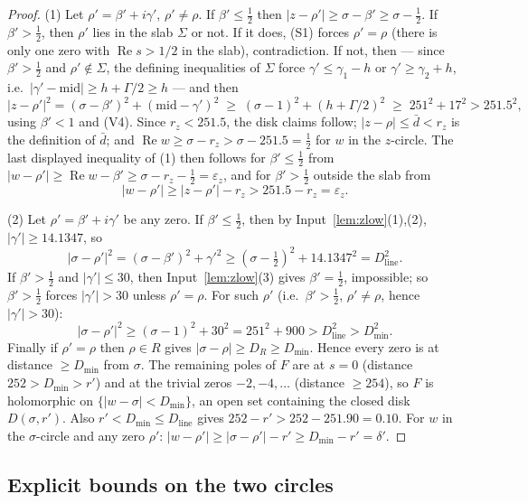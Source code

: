 \documentclass[11pt]{amsart}
\numberwithin{equation}{section}
\newcommand{\re}{\operatorname{Re}}
\newcommand{\Sig}{\sigma}
\newcommand{\dbar}{\bar{d}}
\begin{document}
\begin{proof}
(1) Let $\rho' = \beta' + i\gamma'$, $\rho' \ne \rho$. If
$\beta' \le \tfrac12$ then $|z - \rho'| \ge \Sig - \beta' \ge
\Sig - \tfrac12$. If $\beta' > \tfrac12$, then $\rho'$ lies in the slab
$\Sigma$ or not. If it does, (S1) forces $\rho' = \rho$ (there is only
one zero with $\re s > 1/2$ in the slab), contradiction. If not, then
--- since $\beta' > \tfrac12$ and $\rho' \notin \Sigma$, the defining
inequalities of $\Sigma$ force $\gamma' \le \gamma_1 - h$ or
$\gamma' \ge \gamma_2 + h$, i.e.\
$|\gamma' - \mathrm{mid}| \ge h + \Gamma/2 \ge h$ --- and then
\[
|z - \rho'|^2 = (\Sig - \beta')^2 + (\mathrm{mid} - \gamma')^2
\;\ge\; (\Sig - 1)^2 + (h + \Gamma/2)^2
\;\ge\; 251^2 + 17^2 > 251.5^2,
\]
using $\beta' < 1$ and (V4). Since $r_z < 251.5$, the disk claims
follow; $|z-\rho| \le \dbar < r_z$ is the definition of $\dbar$; and
$\re w \ge \Sig - r_z > \Sig - 251.5 = \tfrac12$ for $w$ in the
$z$-circle. The last displayed inequality of (1) then follows for
$\beta' \le \tfrac12$ from
$|w - \rho'| \ge \re w - \beta' \ge \Sig - r_z - \tfrac12 =
\varepsilon_z$, and for $\beta' > \tfrac12$ outside the slab from
\[
|w-\rho'| \ge |z - \rho'| - r_z > 251.5 - r_z = \varepsilon_z.
\]

(2) Let $\rho' = \beta' + i\gamma'$ be any zero. If $\beta' \le
\tfrac12$, then by Input~\ref{lem:zlow}(1),(2), $|\gamma'| \ge
14.1347$, so
\[
|\Sig - \rho'|^2 = (\Sig - \beta')^2 + \gamma'^2 \ge
(\Sig - \tfrac12)^2 + 14.1347^2 = D_{\mathrm{line}}^2.
\]
If $\beta' > \tfrac12$ and $|\gamma'| \le 30$, then
Input~\ref{lem:zlow}(3) gives $\beta' = \tfrac12$, impossible; so
$\beta' > \tfrac12$ forces $|\gamma'| > 30$ unless $\rho' = \rho$.
For such $\rho'$ (i.e.\ $\beta' > \tfrac12$, $\rho' \neq \rho$, hence
$|\gamma'| > 30$):
\[
|\Sig - \rho'|^2 \ge (\Sig - 1)^2 + 30^2 = 251^2 + 900
> D_{\mathrm{line}}^2 > D_{\min}^2.
\]
Finally if $\rho' = \rho$ then $\rho \in R$ gives
$|\Sig - \rho| \ge D_R \ge D_{\min}$. Hence every zero is at distance
$\ge D_{\min}$ from $\Sig$. The remaining poles of $F$ are at $s = 0$
(distance $252 > D_{\min} > r'$) and at the trivial zeros $-2, -4,
\ldots$ (distance $\ge 254$), so $F$ is holomorphic on
$\{|w - \Sig| < D_{\min}\}$, an open set containing the closed disk
$D(\Sig, r')$. Also $r' < D_{\min} \le D_{\mathrm{line}}$ gives
$252 - r' > 252 - 251.90 = 0.10$. For $w$ in the $\Sig$-circle and any
zero $\rho'$: $|w - \rho'| \ge |\Sig - \rho'| - r' \ge D_{\min} - r'
= \delta'$.
\end{proof}

\subsection{Explicit bounds on the two circles}
\end{document}
